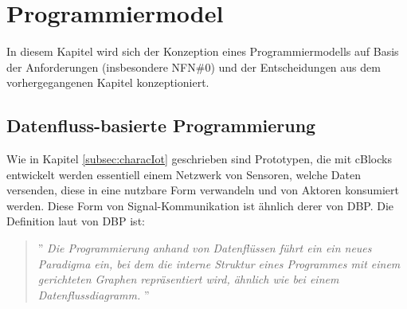 \section{Programmiermodel}
In diesem Kapitel wird sich der Konzeption eines Programmiermodells auf Basis der Anforderungen (insbesondere NFN\#0) und der Entscheidungen aus dem vorhergegangenen Kapitel konzeptioniert.

\subsection{Datenfluss-basierte Programmierung}\label{subsection:datenflussprog}
Wie in Kapitel \ref{subsec:characIot} geschrieben sind Prototypen, die mit cBlocks entwickelt werden essentiell einem Netzwerk von Sensoren, welche Daten versenden, diese in eine nutzbare Form verwandeln und von Aktoren konsumiert werden. Diese Form von Signal-Kommunikation ist ähnlich derer von \ac{DBP}. Die Definition  laut \cite{sousa2012dataflow} von \ac{DBP} ist:
\begin{quote}
    '' \textit{Die Programmierung anhand von Datenflüssen führt ein ein neues Paradigma ein, bei dem die interne Struktur eines Programmes mit einem gerichteten Graphen repräsentiert wird, ähnlich wie bei einem Datenflussdiagramm.} ''
\end{quote}

